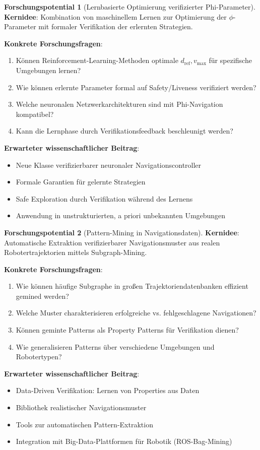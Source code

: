 ﻿\documentclass[a4paper,12pt]{article}
\theoremstyle{definition}
\newtheorem{potential}{Forschungspotential}[section]
\begin{document}
\begin{potential}[Lernbasierte Optimierung verifizierter Phi-Parameter]
\textbf{Kernidee}: Kombination von maschinellem Lernen zur Optimierung der $\phi$-Parameter mit formaler Verifikation der erlernten Strategien.

\textbf{Konkrete Forschungsfragen}:
\begin{enumerate}
	\item Können Reinforcement-Learning-Methoden optimale $d_{\text{ref}}, v_{\max}$ für spezifische Umgebungen lernen?
	\item Wie können erlernte Parameter formal auf Safety/Liveness verifiziert werden?
	\item Welche neuronalen Netzwerkarchitekturen sind mit Phi-Navigation kompatibel?
	\item Kann die Lernphase durch Verifikationsfeedback beschleunigt werden?
\end{enumerate}

\textbf{Erwarteter wissenschaftlicher Beitrag}:
\begin{itemize}
	\item Neue Klasse verifizierbarer neuronaler Navigationscontroller
	\item Formale Garantien für gelernte Strategien
	\item Safe Exploration durch Verifikation während des Lernens
	\item Anwendung in unstrukturierten, a priori unbekannten Umgebungen
\end{itemize}
\end{potential}

\begin{potential}[Pattern-Mining in Navigationsdaten]
\textbf{Kernidee}: Automatische Extraktion verifizierbarer Navigationsmuster aus realen Robotertrajektorien mittels Subgraph-Mining.

\textbf{Konkrete Forschungsfragen}:
\begin{enumerate}
	\item Wie können häufige Subgraphe in großen Trajektoriendatenbanken effizient gemined werden?
	\item Welche Muster charakterisieren erfolgreiche vs. fehlgeschlagene Navigationen?
	\item Können geminte Patterns als Property Patterns für Verifikation dienen?
	\item Wie generalisieren Patterns über verschiedene Umgebungen und Robotertypen?
\end{enumerate}

\textbf{Erwarteter wissenschaftlicher Beitrag}:
\begin{itemize}
	\item Data-Driven Verifikation: Lernen von Properties aus Daten
	\item Bibliothek realistischer Navigationsmuster
	\item Tools zur automatischen Pattern-Extraktion
	\item Integration mit Big-Data-Plattformen für Robotik (ROS-Bag-Mining)
\end{itemize}
\end{potential}
\end{document}
